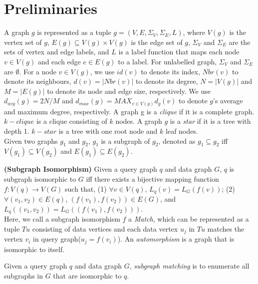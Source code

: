 \section{Preliminaries}
\label{sec:prelim}
A graph $g$ is represented as a tuple $g=(V, E, \Sigma_V,\Sigma_E, L)$, where $V(g)$ is the vertex set of $g$, $E(g) \subseteq V(g) \times V(g)$ is the edge set of $g$, $\Sigma_V$ and $\Sigma_E$ are the sets of vertex and edge labels, and $L$ is a label function that maps each node $v\in V(g)$ and each edge $e \in E(g)$ to a label. For unlabelled graph, $\Sigma_V$ and $\Sigma_E$ are $\emptyset$. For a node $v\in V(g)$, we use $id(v)$ to denote its index, $Nbr(v)$ to denote its neighbours, $d(v)=|Nbr(v)|$ to denote its degree, $N=|V(g)|$ and  $M=|E(g)|$ to denote its node and edge size, respectively. We use $d_{avg}(g) = 2N/M$ and $d_{max}(g) = MAX_{v\in V(g)}d_g(v)$ to denote $g$'s average and maximum degree, respectively. A graph g is a \textit{clique} if it is a complete graph. $k-clique$ is a clique consisting of $k$ nodes. A graph $g$ is a \textit{star} if it is a tree with depth 1. $k-star$ is a tree with one root node and $k$ leaf nodes.\\

Given two graphs $g_1$ and $g_2$, $g_1$ is a subgraph of $g_2$, denoted as $g_1 \subseteq g_2$ iff $V(g_1) \subseteq V(g_2)$ and $E(g_1) \subseteq E(g_2)$.\\

\begin{definition}
\label{def:isomorphism}{\textbf{(Subgraph Isomorphism)}} Given a query graph $q$ and data graph $G$, $q$ is subgraph isomorphic to $G$ iff there exists a bijective mapping function $f: V(q) \rightarrow V(G)$ such that, (1) $\forall v \in V(q)$, $L_q(v) = L_{G}(f(v))$; (2) $\forall (v_1, v_2) \in E(q)$, $(f(v_1), f(v_2)) \in E(G)$, and $L_q((v_1, v_2)) = L_{G}((f(v_1), f(v_2)))$. \\

Here, we call a subgraph isomorphism $f$ a \textit{Match}, which can be represented as a tuple $Tu$ consisting of data vertices and each data vertex $u_j$ in $Tu$ matches the vertex $v_i$ in query graph($u_j = f(v_i)$). An \textit{automorphism} is a graph that is isomorphic to itself.
\end{definition}

 Given a query graph $q$ and data graph $G$, \textit{subgraph matching} is to enumerate all subgraphs in $G$ that are isomorphic to $q$.\\

